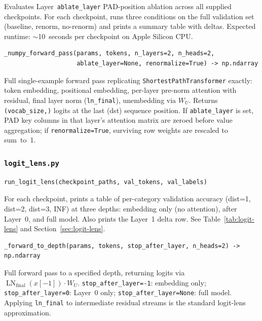 \documentclass[11pt, a4paper]{article}
\DeclareMathOperator{\LN}{LN}
\begin{document}
Evaluates Layer~\texttt{ablate\_layer} PAD-position ablation across all supplied
checkpoints. For each checkpoint, runs three conditions on the full validation
set (baseline, renorm, no-renorm) and prints a summary table with deltas.
Expected runtime: $\sim$10~seconds per checkpoint on Apple Silicon CPU.

\begin{lstlisting}
_numpy_forward_pass(params, tokens, n_layers=2, n_heads=2,
                    ablate_layer=None, renormalize=True) -> np.ndarray
\end{lstlisting}

Full single-example forward pass replicating \texttt{ShortestPathTransformer}
exactly: token embedding, positional embedding, per-layer pre-norm attention with
residual, final layer norm (\texttt{ln\_final}), unembedding via $W_U$.  Returns
\texttt{(vocab\_size,)} logits at the last (dst) sequence position.  If
\texttt{ablate\_layer} is set, PAD key columns in that layer's attention matrix
are zeroed before value aggregation; if \texttt{renormalize=True}, surviving row
weights are rescaled to sum~to~1.

\subsubsection{\texttt{logit\_lens.py}}

\begin{lstlisting}
run_logit_lens(checkpoint_paths, val_tokens, val_labels)
\end{lstlisting}

For each checkpoint, prints a table of per-category validation accuracy
(dist=1, dist=2, dist=3, INF) at three depths: embedding only (no attention),
after Layer~0, and full model.  Also prints the Layer~1 delta row.  See
Table~\ref{tab:logit-lens} and Section~\ref{sec:logit-lens}.

\begin{lstlisting}
_forward_to_depth(params, tokens, stop_after_layer, n_heads=2) -> np.ndarray
\end{lstlisting}

Full forward pass to a specified depth, returning logits via
$\LN_{\text{final}}(x[-1]) \cdot W_U$.  \texttt{stop\_after\_layer=-1}:
embedding only; \texttt{stop\_after\_layer=0}: Layer~0 only;
\texttt{stop\_after\_layer=None}: full model.  Applying \texttt{ln\_final} to
intermediate residual streams is the standard logit-lens approximation.

\end{document}
